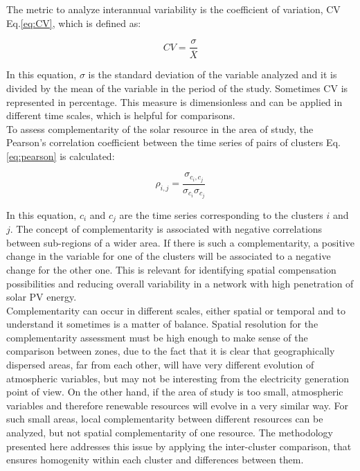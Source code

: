 The metric to analyze interannual variability is the coefficient of variation, CV Eq.\ref{eq:CV}, which is defined as:

\begin{equation}\label{eq:CV}
  CV=\frac{\sigma}{\overline{X}}
\end{equation}

In this equation, $\sigma$ is the standard deviation of the variable analyzed and it is divided by the mean of the variable in the period of the study. Sometimes CV is represented in percentage. This measure is dimensionless and can be applied in different time scales, which is helpful for comparisons.\\

To assess complementarity of the solar resource in the area of study, the Pearson's correlation coefficient between the time series of pairs of clusters Eq.\ref{eq:pearson} is calculated:

\begin{equation}\label{eq:pearson}
  \rho_{i,j}=\frac{\sigma_{c_i,c_j}}{\sigma_{c_i}\sigma_{c_j}}
\end{equation}

In this equation, $c_i$ and $c_j$ are the time series corresponding to the clusters $i$ and $j$. The concept of complementarity is associated with negative correlations between sub-regions of a wider area. If there is such a complementarity, a positive change in the variable for one of the clusters will be associated to a negative change for the other one. This is relevant for identifying spatial compensation possibilities and reducing overall variability in a network with high penetration of solar PV energy.\\

Complementarity can occur in different scales, either spatial or temporal and to understand it sometimes is a matter of balance. Spatial resolution for the complementarity assessment must be high enough to make sense of the comparison between zones, due to the fact that it is clear that geographically dispersed areas, far from each other, will have very different evolution of atmospheric variables, but may not be interesting from the electricity generation point of view. On the other hand, if the area of study is too small, atmospheric variables and therefore renewable resources will evolve in a very similar way. For such small areas, local complementarity between different resources can be analyzed, but not spatial complementarity of one resource. The methodology presented here addresses this issue by applying the inter-cluster comparison, that ensures homogenity within each cluster and differences between them.\\

